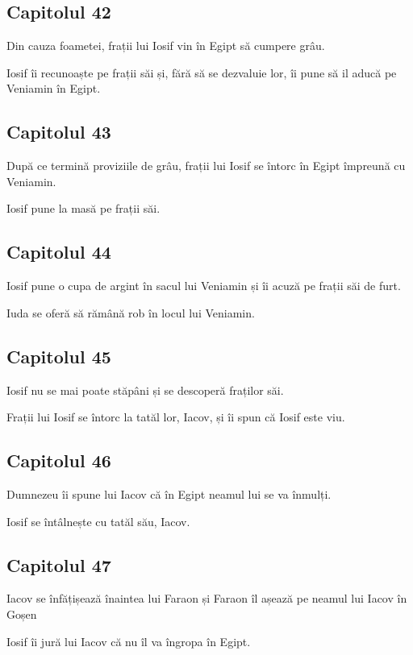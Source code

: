 \documentclass[12pt,a4paper]{article}
\begin{document}
\subsection{Capitolul 42}

Din cauza foametei, frații lui Iosif vin în Egipt să cumpere grâu.

Iosif îi recunoaște pe frații săi și, fără să se dezvaluie lor,
îi pune să il aducă pe Veniamin în Egipt.

\subsection{Capitolul 43}

După ce termină proviziile de grâu, frații lui Iosif se întorc în Egipt împreună cu Veniamin.

Iosif pune la masă pe frații săi.

\subsection{Capitolul 44}

Iosif pune o cupa de argint în sacul lui Veniamin și îi acuză pe frații săi de furt.

Iuda se oferă să rămână rob în locul lui Veniamin.

\subsection{Capitolul 45}

Iosif nu se mai poate stăpâni și se descoperă fraților săi.

Frații lui Iosif se întorc la tatăl lor, Iacov, și îi spun că Iosif este viu.

\subsection{Capitolul 46}

Dumnezeu îi spune lui Iacov că în Egipt neamul lui se va înmulți.

Iosif se întâlnește cu tatăl său, Iacov.

\subsection{Capitolul 47}

Iacov se înfățișează înaintea lui Faraon și Faraon îl așează pe neamul lui Iacov în Goșen

Iosif îi jură lui Iacov că nu îl va îngropa în Egipt.
\end{document}
